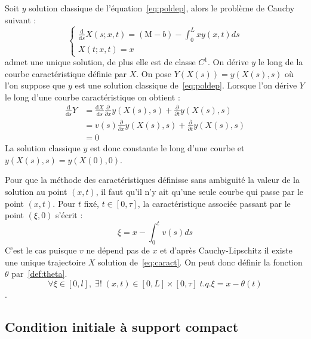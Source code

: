 \documentclass[a4paper]{article}
\newcommand{\mass}{\mathrm{M}}
\newcommand{\dep}{b}
\begin{document}
\begin{preuve}
	Soit $y$ solution classique de l'équation~\eqref{eq:poldep}, 
	alors le problème de Cauchy suivant :
	\begin{equation}
	\begin{cases}
		\label{eq:caract}
		\displaystyle \frac{\mathrm{d}}{\mathrm{d}s} X(s;x,t)= (\mass - \dep) - \int_0^L x y(x,t)ds\\
		X(t;x,t) = x
	\end{cases}
	\end{equation}
	admet une unique solution, de plus elle est de classe $C^1$.
	On dérive $y$ le long de la courbe caractéristique définie par $X$.
	On pose $Y(X(s))=y(X(s),s)$ où l'on suppose que $y$ est une solution classique de~\eqref{eq:poldep}.
	Lorsque l'on dérive $Y$ le long d'une courbe caractéristique on obtient :
	\[ 
	\begin{split}
		\frac{\mathrm{d}}{\mathrm{d}s} Y & = \frac{\mathrm{d} X }{\mathrm{d}s} \frac{\partial}{\partial x}y(X(s),s) + \frac{\partial}{\partial t}y(X(s),s) \\
		                                 & = v(s) \frac{\partial}{\partial x} y(X(s),s) + \frac{\partial}{\partial t} y(X(s),s)\\
										 & =0 
	\end{split}
		\]
	La solution classique $y$ est donc constante le long d'une courbe et $y(X(s),s) = y(X(0),0)$.
	
\end{preuve}

\begin{remarque}
	Pour que la méthode des caractéristiques définisse sans ambiguité la valeur de la solution au point $(x,t)$, 
	il faut qu'il n'y ait qu'une seule courbe qui passe par le point $(x,t)$.
	Pour $t$ fixé, $t \in [0,\tau]$, la caractéristique associée passant par le point $(\xi,0)$ s'écrit :
	\[ \xi = x - \int_0^t v(s)ds \]
	C'est le cas puisque $v$ ne dépend pas de $x$ et d'après Cauchy-Lipschitz il existe une unique trajectoire $X$ solution de~\eqref{eq:caract}. On peut donc définir la fonction $\theta$ par~\eqref{def:theta}.
	\[ \forall \xi \in [0,l], \; \exists ! \; (x,t) \in [0,L]\times[0,\tau] \; t.q. \xi = x - \theta(t) \].
\end{remarque}


\subsection{Condition initiale à support compact}
\end{document}
